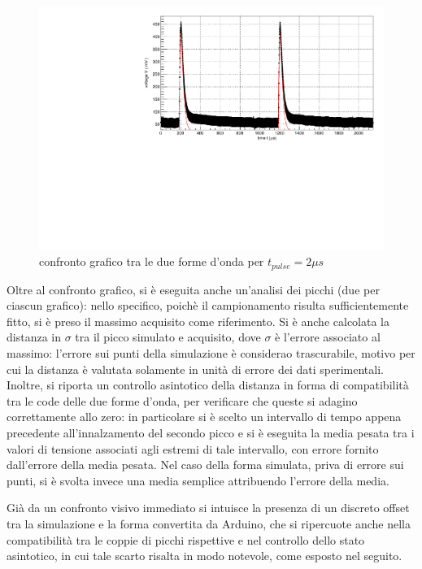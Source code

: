 \documentclass{article}
\begin{document}
\begin{center}
\begin{figure}[H]
\centering
\includegraphics[scale=0.4, angle=0]{arduino2.pdf}
\caption{confronto grafico tra le due forme d'onda per $t_{pulse}=2 \mu s$}
\label{fig:arduino2}
\end{figure}
\end{center}


Oltre al confronto grafico, si è eseguita anche un'analisi dei picchi (due per ciascun grafico): nello specifico, poichè il campionamento risulta sufficientemente fitto, si è preso il massimo
acquisito come riferimento. Si è anche calcolata la distanza in 
$\sigma$ tra il picco simulato e acquisito, dove $\sigma$ è l'errore associato al massimo: l'errore sui punti della simulazione
è considerao trascurabile, motivo per cui la distanza è valutata solamente in unità di errore dei dati sperimentali.
Inoltre, si riporta un controllo asintotico della distanza in forma di compatibilità tra le code delle due forme d'onda, per verificare che queste 
si adagino correttamente allo zero: in particolare si è scelto un intervallo di tempo appena precedente all'innalzamento del secondo picco e si è eseguita la media
pesata tra i valori di tensione associati agli estremi di tale intervallo, con errore fornito dall'errore della media pesata. Nel caso della forma simulata, priva di 
errore sui punti, si è svolta invece una media semplice attribuendo l'errore della media.

Già da un confronto visivo immediato si intuisce la presenza di un discreto offset tra la simulazione e la forma convertita da Arduino, che si ripercuote
anche nella compatibilità tra le coppie di picchi rispettive e nel controllo dello stato asintotico, in cui tale scarto risalta in modo notevole, come esposto
nel seguito.
\end{document}
